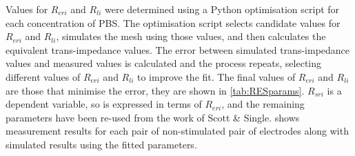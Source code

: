       Values for $R_{eri}$ and $R_{li}$ were determined using a Python optimisation script for each concentration of PBS.
      The optimisation script selects candidate values for $R_{eri}$ and $R_{li}$, simulates the mesh using those values, and then calculates the equivalent trans-impedance values.
      The error between simulated trans-impedance values and measured values is calculated and the process repeats, selecting different values of $R_{eri}$ and $R_{li}$ to improve the fit.
      The final values of $R_{eri}$ and $R_{li}$ are those that minimise the error, they are shown in \cref{tab:RESparams}.
      $R_{sri}$ is a dependent variable, so is expressed in terms of $R_{eri}$, and the remaining parameters have been re-used from the work of Scott \& Single.
       shows measurement results for each pair of non-stimulated pair of electrodes along with simulated results using the fitted parameters.


